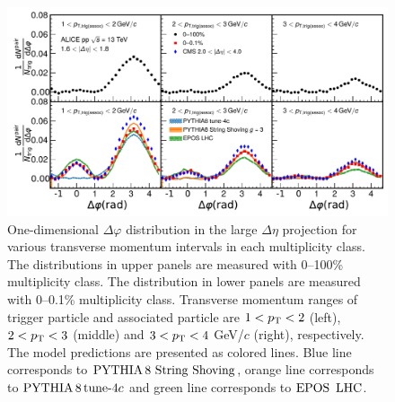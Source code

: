 \begin{figure}[h!]
	\centering
	\includegraphics[width=0.9\linewidth]{./figures/Fig2_PlotDeltaPhi.pdf}
	\caption{One-dimensional $\Delta\varphi$ distribution in the large $\Delta\eta$ projection for various transverse momentum intervals in each multiplicity class. The distributions in upper panels are measured with 0--100\% multiplicity class. The distribution in lower panels are measured with 0--0.1\% multiplicity class. Transverse momentum ranges of trigger particle and associated particle are $1<p_\mathrm{T}<2$ (left), $2<p_\mathrm{T}<3$ (middle) and $3<p_\mathrm{T}<4$ GeV/$c$ (right), respectively. The model predictions are presented as colored lines. Blue line corresponds to ${\mathrm{PYTHIA}\,8~\mathrm{String}~}\mathrm{Shoving}$, orange line corresponds to $\mathrm{PYTHIA}\,8\,\mathrm{tune}{\text -}4c$ and green line corresponds to ${\mathrm{EPOS}\,~\mathrm{LHC}}$.}
	\label{fig:PlotDeltaPhi}
\end{figure}
 
